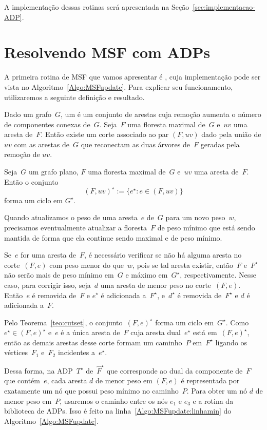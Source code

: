 A implementação dessas rotinas será apresentada na Seção~\ref{sec:implementacao-ADP}.


\section{Resolvendo MSF com ADPs}


A primeira rotina de MSF que vamos apresentar é \MSFupdate{}, cuja implementação pode ser vista no Algoritmo~\ref{Algo:MSFupdate}.
Para explicar seu funcionamento, utilizaremos a seguinte definição e resultado.

Dado um grafo~$G$, um  é um conjunto de arestas cuja remoção aumenta o número de componentes conexas de~$G$.
Seja~$F$ uma floresta maximal de~$G$ e~$uv$ uma aresta de~$F$.
Então existe um corte associado ao par $(F, uv)$ dado pela união de $uv$ com as arestas de~$G$ que reconectam as duas árvores de~$F$ geradas pela remoção de $uv$.

\begin{theorem}
\label{teo:cutset}
Seja~$G$ um grafo plano, $F$ uma floresta maximal de~$G$ e~$uv$ uma aresta de~$F$.
Então o conjunto
$$
(F, uv)^\star := \{e^\star:e\in (F, uv)\}
$$
forma um ciclo em $G^\star$.
\end{theorem}

Quando atualizamos o peso de uma aresta~$e$ de~$G$ para um novo peso~$w$, precisamos eventualmente atualizar a floresta~$F$ de peso mínimo que está sendo mantida de forma que ela continue sendo maximal e de peso mínimo.

Se~$e$ for uma aresta de~$F$, é necessário verificar se não há alguma aresta no corte~$(F, e)$ com peso menor do que~$w$, pois se tal aresta existir, então~$F$ e~$F^\star$ não serão mais de peso mínimo em~$G$ e máximo em~$G^\star$, respectivamente.
Nesse caso, para corrigir isso, seja~$d$ uma aresta de menor peso no corte~$(F, e)$.
Então~$e$ é removida de~$F$ e $e^\star$ é adicionada a~$F^\star$, e~$d^\star$ é removida de~$F^\star$ e $d$ é adicionada a~$F$.

Pelo Teorema~\ref{teo:cutset}, o conjunto~$(F, e)^\star$ forma um ciclo em~$G^\star$.
Como~$e^\star \in (F, e)^\star$ e~$e$ é a única aresta de~$F$ cuja aresta dual~$e^\star$ está em~$(F, e)^\star$, então as demais arestas desse corte formam um caminho~$P$ em~$F^\star$ ligando os vértices~$F_1$ e~$F_2$ incidentes a~$e^\star$.

Dessa forma, na ADP~$T^\star$ de~$\hat F^\star$ que corresponde ao dual da componente de~$F$ que contém~$e$, cada aresta $d$ de menor peso em $(F, e)$ é representada por exatamente um nó que possui peso mínimo no caminho~$P$.
Para obter um nó $d$ de menor peso em~$P$, usaremos o caminho entre os nós $e_1$ e $e_3$ e a rotina \LCOMin{} da biblioteca de ADPs.
Isso é feito na linha~\ref{Algo:MSFupdate:linhamin} do Algoritmo~\ref{Algo:MSFupdate}.


